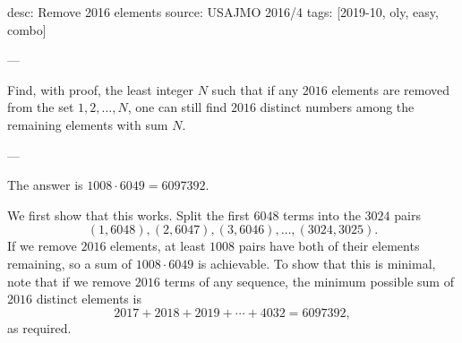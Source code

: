 desc: Remove 2016 elements
source: USAJMO 2016/4
tags: [2019-10, oly, easy, combo]

---

Find, with proof, the least integer $N$ such that if any $2016$ elements are removed from the set $1,2,\ldots,N$, one can still find $2016$ distinct numbers among the remaining elements with sum $N$.

---

The answer is $1008\cdot 6049=6097392$.

We first show that this works. Split the first $6048$ terms into the $3024$ pairs \[(1,6048),(2,6047),(3,6046),\ldots,(3024,3025).\]
If we remove $2016$ elements, at least $1008$ pairs have both of their elements remaining, so a sum of $1008\cdot 6049$ is achievable. To show that this is minimal, note that if we remove $2016$ terms of any sequence, the minimum possible sum of $2016$ distinct elements is \[2017+2018+2019+\cdots+4032=6097392,\]
as required.
